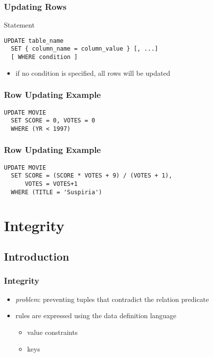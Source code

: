 \documentclass[dvipsnames]{beamer}
\theoremstyle{plain}
\begin{document}
\begin{frame}[fragile]
  \frametitle{Updating Rows}

  \begin{block}{Statement}
    \begin{lstlisting}
UPDATE table_name
  SET { column_name = column_value } [, ...]
  [ WHERE condition ]
    \end{lstlisting}
  \end{block}

  \pause
  \begin{itemize}
    \item if no condition is specified, all rows will be updated
  \end{itemize}
\end{frame}

\begin{frame}[fragile]
  \frametitle{Row Updating Example}

  \begin{example}
    \begin{lstlisting}
UPDATE MOVIE
  SET SCORE = 0, VOTES = 0
  WHERE (YR < 1997)
    \end{lstlisting}
  \end{example}
\end{frame}

\begin{frame}[fragile]
  \frametitle{Row Updating Example}

  \begin{example}
    \begin{lstlisting}
UPDATE MOVIE
  SET SCORE = (SCORE * VOTES + 9) / (VOTES + 1),
      VOTES = VOTES+1
  WHERE (TITLE = 'Suspiria')
    \end{lstlisting}
  \end{example}
\end{frame}

\section{Integrity}

\subsection{Introduction}

\begin{frame}
  \frametitle{Integrity}

  \begin{itemize}
    \item \emph{problem}: preventing tuples that contradict the relation
      predicate

    \pause
    \bigskip
    \item rules are expressed using the data definition language
    \begin{itemize}
      \item value constraints
      \item keys
    \end{itemize}
  \end{itemize}
\end{frame}
\end{document}
